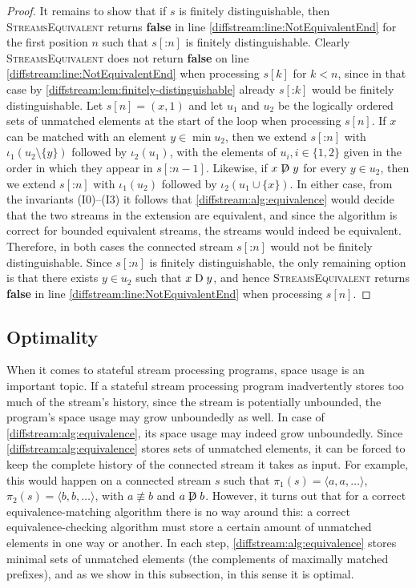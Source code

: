 \begin{proof}
  It remains
  to show that if $s$ is finitely distinguishable, then \textsc{StreamsEquivalent} returns \textbf{false} in line \ref{diffstream:line:NotEquivalentEnd} for the
  first position $n$ such that $s[\mathbin{:} n]$ is finitely distinguishable. Clearly \textsc{StreamsEquivalent} does not return \textbf{false} on line \ref{diffstream:line:NotEquivalentEnd} when processing $s[k]$
  for $k<n$, since in that case by \cref{diffstream:lem:finitely-distinguishable} already $s[\mathbin{:} k]$ would be finitely distinguishable. Let $s[n]=(x,1)$ and let $u_1$ and $u_2$ be the logically ordered sets of unmatched elements at the start of
  the loop when processing $s[n]$.
  If $x$ can be matched with an element $y\in \min u_2$, then we
  extend $s[\mathbin{:} n]$ with $\iota_1(u_2\setminus\{y\})$
  followed by $\iota_2(u_1)$, with the elements of $u_i, i\in\{1,2\}$
  given in the order in
  which they appear in $s[\mathbin{:} {n-1}]$.
  Likewise, if $x\not\mathrel{\mathrm{D}} y$ for every $y\in u_2$, then we extend $s[\mathbin{:} n]$
  with
  $\iota_1(u_2)$ followed by $\iota_2(u_1\cup\{x\})$. In either case, from
  the invariants
  (I0)--(I3) it follows that \cref{diffstream:alg:equivalence} would decide that the
  two streams in the
  extension are equivalent, and since the algorithm is correct
  for bounded equivalent streams, the streams would indeed be equivalent.
  Therefore, in both cases the connected stream $s[\mathbin{:} n]$ would not be
  finitely distinguishable. Since $s[\mathbin{:} n]$ is finitely distinguishable,
  the only remaining option is that there exists $y\in u_2$ such that $x\mathrel{\mathrm{D}} y$, and hence \textsc{StreamsEquivalent} returns \textbf{false} in line \ref{diffstream:line:NotEquivalentEnd} when processing $s[n]$.
\end{proof}

\subsection{Optimality}
\label{diffstream:sec:optimality}

When it comes to stateful stream processing programs, space usage is an
important topic. If a stateful stream processing program inadvertently stores
too much of the stream's history, since the stream is potentially unbounded,
the program's space usage may grow unboundedly as well. In case of
\cref{diffstream:alg:equivalence}, its space usage may indeed grow unboundedly. Since
\cref{diffstream:alg:equivalence} stores sets of unmatched elements, it can be forced to
keep the complete history of the connected stream it takes as input. For example,
this would happen on a connected stream $s$ such that $\pi_1(s)=\langle a, a,
\ldots\rangle$, $\pi_2(s)=\langle b, b, \ldots\rangle$, with $a\not\equiv b$ and $a\not\mathrel{\mathrm{D}} b$.
However, it turns out that for a correct equivalence-matching algorithm there
is no way around this: a correct
equivalence-checking algorithm must store a certain amount
of unmatched elements in one way or another. In each step,
\cref{diffstream:alg:equivalence} stores
minimal sets of unmatched elements (the complements of maximally matched
prefixes), and as we show in this subsection, in this sense it is optimal.


